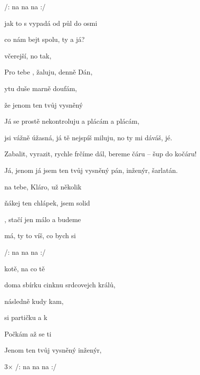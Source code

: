 

/:  na na na    :/

\zs
{} jak to s  vypadá od půl  do osmi 

co nám  bejt spolu,  ty a já?

 včerejší, no tak, 

Pro tebe , žaluju, denně  Dán,

ytu duše marně  doufám,

že  jenom  ten tvůj vysněný  
\ks

\zs
Já se prostě nekontroluju a plácám a plácám,

jsi vážně úžasná, já tě nejspíš miluju,
no ty mi dáváš, jé.

Zabalit, vyrazit, rychle frčíme dál,
bereme čáru -- šup do kočáru!

Já, jenom já jsem ten tvůj vysněný pán,
inženýr, šarlatán.
\ks

\zr
{} na tebe, Kláro, už několik  

 ňákej ten chlápek, jsem solid 

, stačí jen málo a budeme  

 má, ty to víš, co bych si  
\kr


/:  na na na    :/


\zs
{} kotě, na co tě 

 doma sbírku cinknu srdcovejch králů,

 následně  kudy kam,

 si partičku a  k 

Počkám až    se ti 

Jenom  ten tvůj vysněný 
inženýr, 
\ks

\zr  \kr

3× /:  na na na   
 :/

\kp
